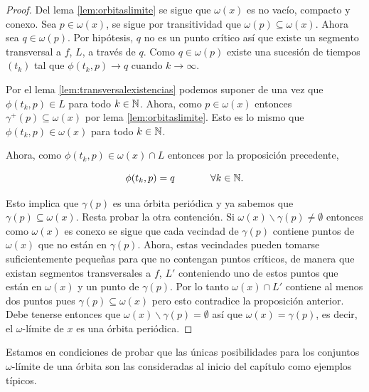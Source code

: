 \begin{proof}
Del lema \ref{lem:orbitaslimite} se sigue que $\omega(x)$ es no vacío, compacto y conexo. Sea $p \in \omega(x)$, se sigue por transitividad que $\omega(p) \subseteq \omega(x)$. Ahora sea $q \in \omega(p)$. Por hipótesis, $q$ no es un punto crítico así que existe un segmento transversal a $f$, $L$, a través de $q$.  Como $q \in \omega(p)$ existe una sucesión de tiempos $(t_k)$ tal que $\phi(t_k, p) \to q$ cuando $k \to \infty$.

Por el lema \ref{lem:transversalexistencias} podemos suponer de una vez que $\phi(t_k, p) \in L$ para todo $k \in {\ensuremath{\mathbb{N}}}$. Ahora, como $p \in \omega(x)$ entonces $\gamma^+(p) \subseteq \omega(x)$ por lema \ref{lem:orbitaslimite}. Esto es lo mismo que $\phi(t_k, p) \in \omega(x)$ para todo $k \in {\ensuremath{\mathbb{N}}}$.

Ahora, como $\phi(t_k, p) \in \omega(x) \cap L$ entonces por la proposición precedente,

$$ \phi(t_k, p) = q  \hspace{0.5in} \forall k \in {\ensuremath{\mathbb{N}}}.$$

Esto implica que $\gamma(p)$ es una órbita periódica y ya sabemos que $\gamma(p) \subseteq \omega(x)$. Resta probar la otra contención.
Si $\omega(x) \backslash \gamma(p) \neq \emptyset$ entonces como $\omega(x)$ es conexo se sigue que cada vecindad de $\gamma(p)$ contiene puntos de $\omega(x)$ que no están en $\gamma(p)$.
Ahora, estas vecindades pueden tomarse suficientemente pequeñas para que no contengan puntos críticos, de manera que existan segmentos transversales a $f$, $L'$ conteniendo uno de estos puntos que están en $\omega(x)$ y un punto de $\gamma(p)$. Por lo tanto $\omega(x) \cap L'$ contiene al menos dos puntos pues $\gamma(p) \subseteq \omega(x)$ pero esto contradice la proposición anterior.
Debe tenerse entonces que $\omega(x) \backslash \gamma(p) = \emptyset$ así que $\omega(x) = \gamma(p)$, es decir, el $\omega$-límite de $x$ es una órbita periódica.

\end{proof}

Estamos en condiciones de probar que las únicas posibilidades para los conjuntos $\omega$-límite de una órbita son las consideradas al inicio del capítulo como ejemplos típicos.

